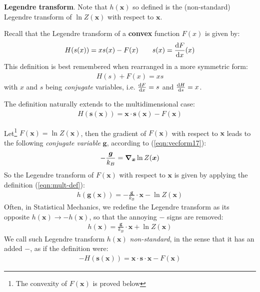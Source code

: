 \documentclass[../../main.tex]{subfiles}
\begin{document}
\begin{appr}
    \textbf{Legendre transform}. Note that $h(\bm{x})$ so defined is the (non-standard) Legendre transform of $\ln Z(\bm{x})$ with respect to $\bm{x}$.
    
    \medskip

    Recall that the Legendre transform of a \textbf{convex}  function $F(x)$ is given by:
    \begin{align*}
        H(s(x)) = x s(x) -F(x) \qquad s(x) = {\dv{F}{x}}(x)
    \end{align*}
    This definition is best remembered when rearranged in a more symmetric form:
    \begin{align*}
        H(s) + F(x) = xs
    \end{align*}
    with $x$ and $s$ being \textit{conjugate} variables, i.e. $\dv{F}{x} = s$ and $\dv{H}{s} = x$.
    
    \medskip

    The definition naturally extends to the multidimensional case:
    \begin{align}\label{eqn:mult-def}
        H(\bm{s}(\bm{x})) = \bm{x} \cdot \bm{s}(\bm{x}) - F(\bm{x}) 
    \end{align}

    Let\footnote{The convexity of $F(\bm{x})$ is proved below} $F(\bm{x}) = \ln Z(\bm{x})$, then the gradient of $F(\bm{x})$ with respect to $\bm{x}$ leads to the following \textit{conjugate variable} $\bm{g}$, according to (\ref{eqn:vecform17}):
    \begin{align*}
        -\frac{\bm{g}}{k_B} = \grad_{\bm{x}} \ln Z(\bm{x})
    \end{align*} 
    So the Legendre transform of $F(\bm{x})$ with respect to $\bm{x}$ is given by applying the definition (\ref{eqn:mult-def}):
    \begin{align*}
        h(\bm{g}(\bm{x})) = -\frac{\bm{g}}{k_B} \cdot \bm{x} - \ln Z(\bm{x}) 
    \end{align*}
    Often, in Statistical Mechanics, we redefine the Legendre transform as its opposite $h(\bm{x}) \to -h(\bm{x})$, so that the annoying $-$ signs are removed:
    \begin{align*}
        h(\bm{x}) = \frac{\bm{g}}{k_B} \cdot \bm{x} + \ln Z(\bm{x})
    \end{align*}
    We call such Legendre transform $h(\bm{x})$ \textit{non-standard}, in the sense that it has an added $-$, as if the definition were:
    \begin{align*}
        -H(\bm{s}(\bm{x})) = \bm{x} \cdot \bm{s} \cdot \bm{x} - F(\bm{x})
    \end{align*} 
\end{appr}
\end{document}
